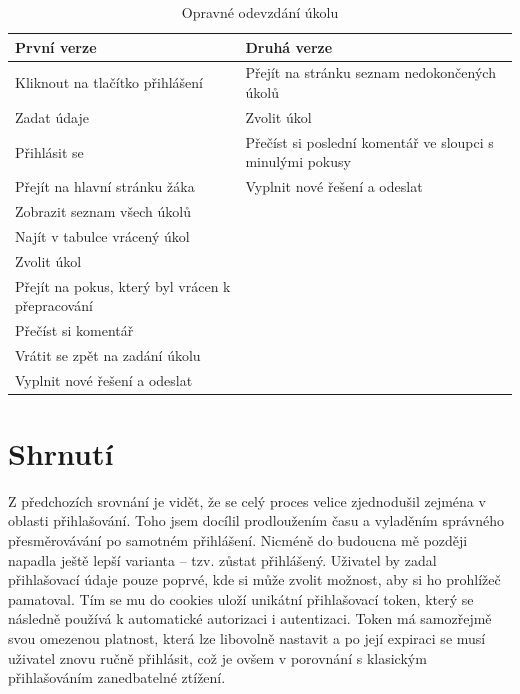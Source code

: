 \documentclass[twoside]{ctuthesis}
\theoremstyle{plain}
\theoremstyle{definition}
\theoremstyle{note}
\begin{document}
\begin{table}[H]
    \centering
    \begin{tabular}{ |p{}|p{}| } 
        \hline
        \rowcolor{tabledarkblue}
        První verze & Druhá verze\\
        \hline
        Kliknout na tlačítko přihlášení & Přejít na stránku seznam nedokončených úkolů \\ 
        Zadat údaje & Zvolit úkol \\ 
        Přihlásit se & Přečíst si poslední komentář ve sloupci s minulými pokusy\\ 
        Přejít na hlavní stránku žáka & Vyplnit nové řešení a odeslat\\
        Zobrazit seznam všech úkolů & \\
        Najít v tabulce vrácený úkol & \\
        Zvolit úkol & \\
        Přejít na pokus, který byl vrácen k přepracování & \\
        Přečíst si komentář & \\
        Vrátit se zpět na zadání úkolu & \\
        Vyplnit nové řešení a odeslat & \\
        \hline
    \end{tabular}
    \caption{Opravné odevzdání úkolu}
    \label{table:resubmitAttempt}
\end{table}



\section{Shrnutí}
Z předchozích srovnání je vidět, že se celý proces velice zjednodušil zejména v oblasti přihlašování. Toho jsem docílil prodloužením času  a vyladěním správného přesměrovávání po samotném přihlášení. Nicméně do budoucna mě později napadla ještě lepší varianta -- tzv. zůstat přihlášený. Uživatel by zadal přihlašovací údaje pouze poprvé, kde si může zvolit možnost, aby si ho prohlížeč pamatoval. Tím se mu do cookies uloží unikátní přihlašovací token, který se následně používá k automatické autorizaci i autentizaci. Token má samozřejmě svou omezenou platnost, která lze libovolně nastavit a po její expiraci se musí uživatel znovu ručně přihlásit, což je ovšem v porovnání s klasickým přihlašováním zanedbatelné ztížení.
\end{document}
